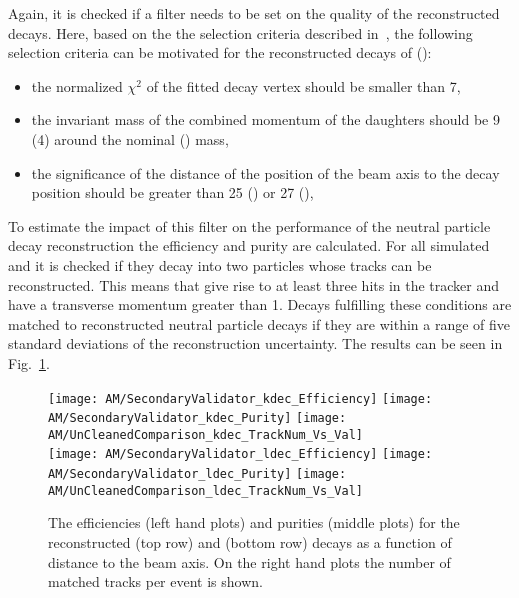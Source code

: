 Again, it is checked if a filter needs to be set on the quality of the reconstructed decays. Here, based on the the selection criteria described in~\cite{v0paper}, the following selection criteria can be motivated for the reconstructed decays of \PKzS{} (\PgL{}):
\begin{itemize}
    \item the normalized $\chi^{2}$ of the fitted decay vertex should be smaller than 7,
    \item the invariant mass of the combined momentum of the daughters should be 9\MeVcc{} (4\MeVcc{}) around the nominal \PKzS{} (\PgL{}) mass,
    \item the significance of the distance of the position of the beam axis to the decay position should be greater than 25 (\PKzS{}) or 27 (\PgL{}),
\end{itemize}
To estimate the impact of this filter on the performance of the neutral particle decay reconstruction the efficiency and purity are calculated. For all simulated \PKzS{} and \PgL{} it is checked if they decay into two particles whose tracks can be reconstructed. This means that give rise to at least three hits in the tracker and have a transverse momentum greater than 1\GeV. Decays fulfilling these conditions are matched to reconstructed neutral particle decays if they are within a range of five standard deviations of the reconstruction uncertainty. The results can be seen in Fig.~\ref{plot:AMWFSVdecEffAndPurDC}.

\begin{figure}[!ht]
    \centering
    \texttt{[image: AM/SecondaryValidator\_kdec\_Efficiency]}
    \texttt{[image: AM/SecondaryValidator\_kdec\_Purity]}
    \texttt{[image: AM/UnCleanedComparison\_kdec\_TrackNum\_Vs\_Val]}
    \\
    \texttt{[image: AM/SecondaryValidator\_ldec\_Efficiency]}
    \texttt{[image: AM/SecondaryValidator\_ldec\_Purity]}
    \texttt{[image: AM/UnCleanedComparison\_ldec\_TrackNum\_Vs\_Val]}
    \caption[Efficiency and purity of the reconstructed \PKzS{} and \PgL{} decays as a function of distance to the beam axis and number of matched tracks]{The efficiencies (left hand plots) and purities (middle plots) for the reconstructed \PKzS{} (top row) and \PgL{} (bottom row) decays as a function of distance to the beam axis. On the right hand plots the number of matched tracks per event is shown. \label{plot:AMWFSVdecEffAndPurDC}}
\end{figure}

